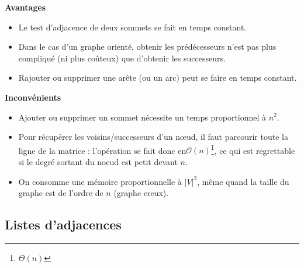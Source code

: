 \begin{minipage}[t]{.47\linewidth}
\begin{center}
\textbf{Avantages}
\end{center}
\begin{itemize}
\item Le test d’adjacence de deux sommets se fait en temps constant.
\item Dans le cas d’un graphe orienté, obtenir les prédécesseurs n’est pas plus compliqué (ni plus coûteux)
que d’obtenir les successeurs.
\item Rajouter ou supprimer une arête (ou un arc) peut se faire en temps constant.
\end{itemize}
\end{minipage}
\hfill
\begin{minipage}[t]{.47\linewidth}
\begin{center}
\textbf{Inconvénients}
\begin{itemize}
\item Ajouter ou supprimer un sommet nécessite un temps proportionnel à $n^2$.
\item Pour récupérer les voisins/successeurs d’un nœud, il faut parcourir toute la ligne de la matrice :
l’opération se fait donc en$\mathcal{O}(n)$\footnote{$\Theta(n)$}, ce qui est regrettable si le degré sortant du noeud est petit devant $n$.
\item On consomme une mémoire proportionnelle à $|V|^2$, même quand la taille du graphe est de l’ordre de $n$ (graphe creux).
\end{itemize}
\end{center}
\end{minipage}

\subsection{Listes d'adjacences}

